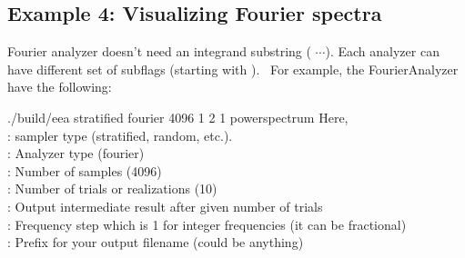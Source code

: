 \subsection{Example 4: Visualizing Fourier spectra}
 
Fourier analyzer doesn't need an integrand substring ( $\cdots$). Each analyzer can have different set of subflags (starting with \cdashs). \
For example, the FourierAnalyzer have the following:
%
\begin{tcolorbox}
./build/eea   stratified   fourier  4096  1   2  1   powerspectrum
\tcblower
Here, \\
: sampler type (stratified, random, etc.). \\
:  Analyzer type (fourier) \\
: Number of samples (4096) \\
: Number of trials or realizations (10) \\
:  Output intermediate result after given number of trials  \\
\cdashs{wstep}: Frequency step which is 1 for integer frequencies (it can be fractional)\\
\cdashs{ofile}: Prefix for your output filename (could be anything)
\end{tcolorbox}
%


